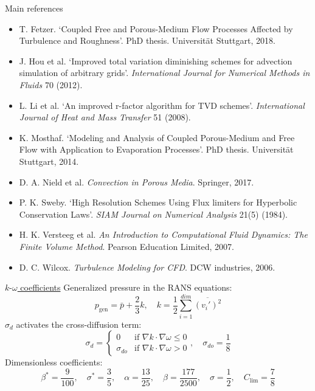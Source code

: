 \documentclass{beamer}
\begin{document}
\begin{frame}{Main references}
\begin{itemize}
	\footnotesize
	\item T. Fetzer. `Coupled Free and Porous-Medium Flow Processes Affected by 
	Turbulence and Roughness'. PhD thesis. Universit\"at Stuttgart, 2018.
	\item J. Hou et al. `Improved total variation diminishing schemes for 
	advection simulation of arbitrary grids'. \emph{International Journal for 
	Numerical Methods in Fluids} 70 (2012).
	\item L. Li et al. `An improved r-factor algorithm for TVD schemes'. 
	\emph{International Journal of Heat and Mass Transfer} 51 (2008).
	\item K. Mosthaf. `Modeling and Analysis of Coupled  Porous-Medium and Free 
	Flow with Application to Evaporation Processes'. PhD thesis. Universit\"at 
	Stuttgart, 2014.
	\item D. A. Nield et al. \emph{Convection in Porous Media}. Springer, 2017.
	\item P. K. Sweby. `High Resolution Schemes Using Flux limiters for 
	Hyperbolic Conservation Laws'. \emph{SIAM Journal on Numerical Analysis} 
	21(5) (1984).
	\item H. K. Versteeg et al. \emph{An Introduction to Computational Fluid 
	Dynamics: The Finite Volume Method}. Pearson Education Limited, 2007.
	\item D. C. Wilcox. \emph{Turbulence Modeling for CFD}. DCW industries, 
	2006. 
\end{itemize}
\end{frame}
\begin{frame}[label=koSupp]{\hyperlink{ko}{$k\text{-}\omega$ coefficients}}
Generalized pressure in the RANS equations:
\begin{equation*}
	p_\text{gen} = \bar{p} + \frac{2}{3}k, \quad k = \frac{1}{2} 
	\sum_{i=1}^{dim} \overline{(v_i')^2}
\end{equation*}
$\sigma_d$ activates the cross-diffusion term:
\begin{equation*}
\sigma_d =
\begin{cases} 0 &\text{if $\nabla k \cdot \nabla \omega \leq 0$}\\
\sigma_{do} &\text{if $\nabla k \cdot \nabla \omega > 0$}
\end{cases},
\quad \sigma_{do} = \frac{1}{8}
\end{equation*}
Dimensionless coefficients:
\begin{equation*}
\beta^* = \frac{9}{100}, \quad \sigma^* = \frac{3}{5}, \quad \alpha = 
\frac{13}{25}, \quad \beta = \frac{177}{2500}, \quad \sigma = \frac{1}{2}, 
\quad C_\text{lim} = \frac{7}{8}
\end{equation*}
\end{frame}
\end{document}
